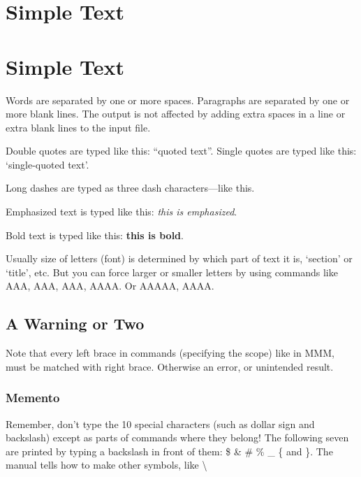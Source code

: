 \documentclass{article}        %
\begin{document}


\section{Simple Text}          %


\section*{Simple Text}          %

Words are separated by one     or more           spaces.  Paragraphs are separated by
one or more blank lines.  The output
is not affected by           adding extra
spaces  in a line or       extra blank          lines to the input file.


Double quotes are typed like this: ``quoted text''.
Single quotes are typed like this: `single-quoted text'.

Long dashes are typed as three dash characters---like this.

Emphasized text is typed like this: \emph{this is emphasized}.

Bold       text is typed like this: \textbf{this is bold}.

Usually size of letters (font) is determined by which part of text it is, `section' or `title', etc. But you can force larger or smaller letters by using commands like {\large AAA}, {\Large AAA}, {\LARGE AAA}, {\Huge AAAA}. Or {\small AAAAA}, {\tiny AAAA}.


\subsection{A Warning or Two}  %

Note that every left brace in commands (specifying the scope) like in {\Large MMM}, must be matched with right brace. Otherwise an error, or unintended result.

\subsubsection{Memento}

Remember, don't type the 10 special characters (such as dollar sign and
backslash) except as parts of commands where they belong!  The following seven are printed by
typing a backslash in front of them:  \$  \&  \#  \%  \_  \{  and  \}.
The manual tells how to make other symbols, like \textbackslash
\end{document}
